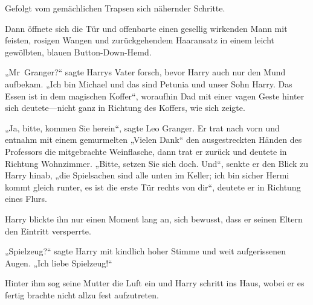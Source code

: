 Gefolgt vom gemächlichen Trapsen sich nähernder Schritte.

Dann öffnete sich die Tür und offenbarte einen gesellig wirkenden Mann mit feisten, rosigen Wangen und zurückgehendem Haaransatz in einem leicht gewölbten, blauen Button-Down-Hemd.

„Mr~Granger?“ sagte Harrys Vater forsch, bevor Harry auch nur den Mund aufbekam. „Ich bin Michael und das sind Petunia und unser Sohn Harry. Das Essen ist in dem magischen Koffer“, woraufhin Dad mit einer vagen Geste hinter sich deutete—nicht ganz in Richtung des Koffers, wie sich zeigte.

„Ja, bitte, kommen Sie herein“, sagte Leo Granger. Er trat nach vorn und entnahm mit einem gemurmelten „Vielen Dank“ den ausgestreckten Händen des Professors die mitgebrachte Weinflasche, dann trat er zurück und deutete in Richtung Wohnzimmer. „Bitte, setzen Sie sich doch. Und“, senkte er den Blick zu Harry hinab, „die Spielsachen sind alle unten im Keller; ich bin sicher Hermi kommt gleich runter, es ist die erste Tür rechts von dir“, deutete er in Richtung eines Flurs.

Harry blickte ihn nur einen Moment lang an, sich bewusst, dass er seinen Eltern den Eintritt versperrte.

„Spielzeug?“ sagte Harry mit kindlich hoher Stimme und weit aufgerissenen Augen. „Ich liebe Spielzeug!“

Hinter ihm sog seine Mutter die Luft ein und Harry schritt ins Haus, wobei er es fertig brachte nicht allzu fest aufzutreten.

